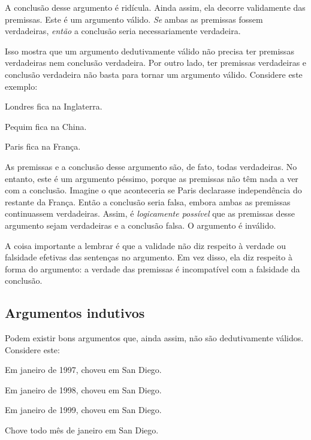 A conclusão desse argumento é ridícula. Ainda assim, ela decorre validamente das premissas. Este é um argumento válido. \emph{Se} ambas as premissas fossem verdadeiras, \emph{então} a conclusão seria necessariamente verdadeira.

Isso mostra que um argumento dedutivamente válido não precisa ter premissas verdadeiras nem conclusão verdadeira. Por outro lado, ter premissas verdadeiras e conclusão verdadeira não basta para tornar um argumento válido. Considere este exemplo:

\begin{earg}
\item[] Londres fica na Inglaterra.
\item[] Pequim fica na China.
\item[\therefore] Paris fica na França.
\end{earg}

As premissas e a conclusão desse argumento são, de fato, todas verdadeiras. No entanto, este é um argumento péssimo, porque as premissas não têm nada a ver com a conclusão. Imagine o que aconteceria se Paris declarasse independência do restante da França. Então a conclusão seria falsa, embora ambas as premissas continuassem verdadeiras. Assim, é \emph{logicamente possível} que as premissas desse argumento sejam verdadeiras e a conclusão falsa. O argumento é inválido.

A coisa importante a lembrar é que a validade não diz respeito à verdade ou falsidade efetivas das sentenças no argumento. Em vez disso, ela diz respeito à forma do argumento: a verdade das premissas é incompatível com a falsidade da conclusão.

\subsection{Argumentos indutivos}

Podem existir bons argumentos que, ainda assim, não são dedutivamente válidos. Considere este:

\begin{earg}
\item[] Em janeiro de 1997, choveu em San Diego.
\item[] Em janeiro de 1998, choveu em San Diego.
\item[] Em janeiro de 1999, choveu em San Diego.
\item[\therefore] Chove todo mês de janeiro em San Diego.
\end{earg}


